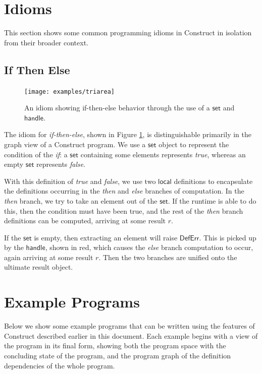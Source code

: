 \documentclass[twoside,openright,11pt]{report}
\begin{document}
\section{Idioms}
\label{sec:idioms}

This section shows some common programming idioms in Construct in isolation from their broader context.

\subsection{If Then Else}
\label{subsec:if}

\begin{figure}[h]
  \centering
  \texttt{[image: examples/triarea]}
  \caption{An idiom showing if-then-else behavior through the use of a $\mathsf{set}$ and $\mathsf{handle}$.}
  \label{fig:ifthenelse}
\end{figure}

The idiom for {\it if-then-else}, shown in Figure \ref{fig:ifthenelse}, is distinguishable primarily in the graph view of a Construct program.
We use a $\mathsf{set}$ object to represent the condition of the {\it if}: a $\mathsf{set}$ containing some elements represents {\it true}, whereas an empty $\mathsf{set}$ represents {\it false}.

With this definition of {\it true} and {\it false}, we use two $\mathsf{local}$ definitions to encapsulate the definitions occurring in the {\it then} and {\it else} branches of computation. 
In the {\it then} branch, we try to take an element out of the $\mathsf{set}$. 
If the runtime is able to do this, then the condition must have been true, and the rest of the {\it then} branch definitions can be computed, arriving at some result $r$.

If the $\mathsf{set}$ is empty, then extracting an element will raise $\mathsf{DefErr}$. 
This is picked up by the $\mathsf{handle}$, shown in red, which causes the {\it else} branch computation to occur, again arriving at some result $r$.
Then the two branches are unified onto the ultimate result object.

\section{Example Programs}
\label{sec:example}

Below we show some example programs that can be written using the features of Construct described earlier in this document. 
Each example begins with a view of the program in its final form, showing both the program space with the concluding state of the program, and the program graph of the definition dependencies of the whole program.
\end{document}
